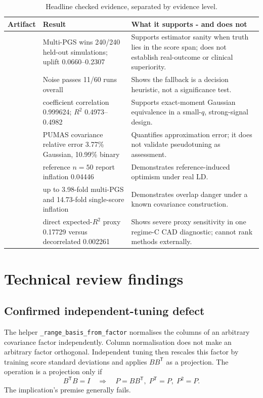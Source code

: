 \documentclass[10pt,a4paper]{article}
\newcommand{\code}[1]{\texttt{#1}}
\newcommand{\Rtwo}{\(R^2\)}
\begin{document}
\begin{table}[H]
\centering
\caption{Headline checked evidence, separated by evidence level.}
\label{tab:evidence}
\scriptsize
\begin{tabularx}{\linewidth}{@{}L{31mm}L{34mm}Y@{}}
\toprule
\textbf{Artifact} & \textbf{Result} & \textbf{What it supports - and does not} \\
\midrule
{} & Multi-PGS wins 240/240 held-out simulations; uplift
0.0660--0.2307 & Supports estimator sanity when truth lies in the score span;
does not establish real-outcome or clinical superiority. \\
 & Noise passes 11/60 runs overall & Shows the fallback is a
decision heuristic, not a significance test. \\
 & coefficient correlation 0.999624; \Rtwo{}
0.4973--0.4982 & Supports exact-moment Gaussian equivalence in a small-\(q\),
strong-signal design. \\
 & PUMAS covariance relative error 3.77\% Gaussian,
10.99\% binary & Quantifies approximation error; it does not validate
pseudotuning as assessment. \\
 & reference \(n=50\) report inflation 0.04446 &
Demonstrates reference-induced optimism under real LD. \\
 & up to 3.98-fold multi-PGS and 14.73-fold single-score
inflation & Demonstrates overlap danger under a known covariance construction. \\
 & direct expected-\Rtwo{} proxy 0.17729 versus
decorrelated 0.002261 & Shows severe proxy sensitivity in one regime-C CAD
diagnostic; cannot rank methods externally. \\
\bottomrule
\end{tabularx}
\end{table}

\section{Technical review findings}
\label{sec:findings}

\subsection{Confirmed independent-tuning defect}

The helper \code{\_range\_basis\_from\_factor} normalises the columns of an
arbitrary covariance factor independently. Column normalisation does not make
an arbitrary factor orthogonal. Independent tuning then rescales this factor
by training score standard deviations and applies \(BB^{\mathsf T}\) as a
projection. The operation is a projection only if
\begin{equation}
  B^{\mathsf T}B=I
  \quad\Longrightarrow\quad
  P=BB^{\mathsf T},\;
  P^{\mathsf T}=P,\;
  P^2=P.
  \label{eq:orthogonal-projection}
\end{equation}
The implication's premise generally fails.
\end{document}
